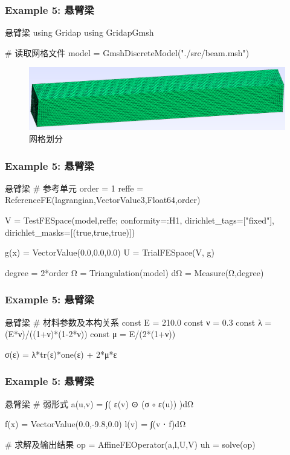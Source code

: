 \documentclass[lang=en,aspectratio=43,theme=default,logo=on]{simplebeamer}
\begin{document}
\begin{frame}[fragile]
    \frametitle{Example 5: 悬臂梁}
\begin{codex}{1}{悬臂梁}
using Gridap
using GridapGmsh

# 读取网格文件
model = GmshDiscreteModel("./src/beam.msh")
\end{codex}
\begin{figure}
    \centering %
    \includegraphics[width=1.0\textwidth]{./img/015.png}
    \caption{网格划分}
\end{figure}
\end{frame}

\begin{frame}[fragile]
    \frametitle{Example 5: 悬臂梁}
\begin{codex}{6}{悬臂梁}
# 参考单元
order = 1
reffe = ReferenceFE(lagrangian,VectorValue{3,Float64},order)

V = TestFESpace(model,reffe; conformity=:H1,
dirichlet_tags=["fixed"],
dirichlet_masks=[(true,true,true)])

g(x) = VectorValue(0.0,0.0,0.0)
U = TrialFESpace(V, g)

degree = 2*order
Ω = Triangulation(model)
dΩ = Measure(Ω,degree)
\end{codex}
\end{frame}

\begin{frame}[fragile]
    \frametitle{Example 5: 悬臂梁}
\begin{codex}{20}{悬臂梁}
# 材料参数及本构关系
const E = 210.0
const ν = 0.3
const λ = (E*ν)/((1+ν)*(1-2*ν))
const μ = E/(2*(1+ν))

σ(ε) = λ*tr(ε)*one(ε) + 2*μ*ε
\end{codex}
\end{frame}

\begin{frame}[fragile]
    \frametitle{Example 5: 悬臂梁}
\begin{codex}{27}{悬臂梁}
# 弱形式
a(u,v) = ∫( ε(v) ⊙ (σ $\circ$ ε(u)) )dΩ

f(x) = VectorValue(0.0,-9.8,0.0)
l(v) = ∫(v ⋅ f)dΩ

# 求解及输出结果
op = AffineFEOperator(a,l,U,V)
uh = solve(op)
\end{codex}
\end{frame}
\end{document}
